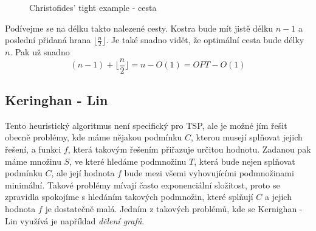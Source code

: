 \documentclass[
  biblatex,
  figures=false,
  glossaries,
  index
]{kidiplom}
\begin{document}
\begin{figure}[H]
        \begin{center}
        \end{center}
    \caption{Christofides' tight example - cesta}
\end{figure}

Podívejme se na délku takto nalezené cesty. Kostra bude mít jistě délku $n - 1$ a poslední přidaná hrana $\lfloor \frac{n}{2} \rfloor$. Je také snadno vidět, že optimální cesta bude délky $n$. Pak už snadno $$(n - 1) + \lfloor \frac{n}{2} \rfloor = n - O(1) = OPT - O(1)$$

\subsection{Keringhan - Lin}

Tento heuristický algoritmus není specifický pro TSP, ale je možné jím řešit obecně problémy, kde máme nějakou podmínku $C$, kterou musejí splňovat jejich řešení, a funkci $f$, která takovým řešením přiřazuje určitou hodnotu. Zadanou pak máme množinu $S$, ve které hledáme podmnožinu $T$, která bude nejen splňovat podmínku $C$, ale její hodnota $f$ bude mezi všemi vyhovujícími podmnožinami minimální. Takové problémy mívají často exponenciální složitost, proto se zpravidla spokojíme s hledáním takových podmnožin, které splňují $C$ a jejich hodnota $f$ je dostatečně malá. Jedním z takových problémů, kde se Kernighan - Lin využívá je například \textit{dělení grafů}. 
\end{document}
